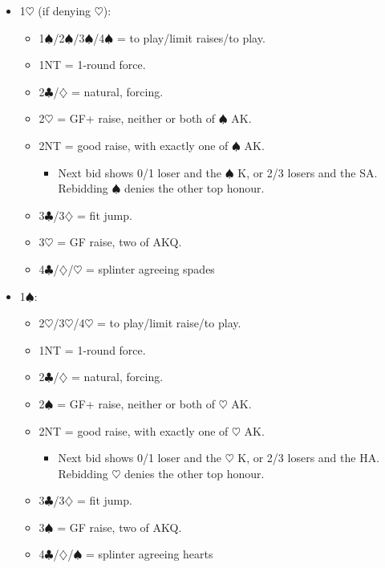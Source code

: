 \documentclass[a4paper,12pt]{article}
\begin{document}
\begin{itemize}
\item 1$\heartsuit$ (if denying $\heartsuit$):
	\begin{itemize}
   \item 1$\spadesuit$/2$\spadesuit$/3$\spadesuit$/4$\spadesuit$ = to play/limit raises/to play.
   \item 1NT = 1-round force.
   \item 2$\clubsuit$/$\diamondsuit$ = natural, forcing.
   \item 2$\heartsuit$ = GF+ raise, neither or both of $\spadesuit$ AK.
   \item 2NT = good raise, with exactly one of $\spadesuit$ AK.
		\begin{itemize}
      \item Next bid shows 0/1 loser and the $\spadesuit$ K, or 2/3 losers and the SA.
         Rebidding $\spadesuit$ denies the other top honour.
		\end{itemize}
   \item 3$\clubsuit$/3$\diamondsuit$ = fit jump.
   \item 3$\heartsuit$ = GF raise, two of AKQ.
   \item 4$\clubsuit$/$\diamondsuit$/$\heartsuit$ = splinter agreeing spades
	\end{itemize}

\item 1$\spadesuit$:
	\begin{itemize}
   \item 2$\heartsuit$/3$\heartsuit$/4$\heartsuit$ = to play/limit raise/to play.
   \item 1NT = 1-round force.
   \item 2$\clubsuit$/$\diamondsuit$ = natural, forcing.
   \item 2$\spadesuit$ = GF+ raise, neither or both of $\heartsuit$ AK.
   \item 2NT = good raise, with exactly one of $\heartsuit$ AK.
		\begin{itemize}
      \item Next bid shows 0/1 loser and the $\heartsuit$ K, or 2/3 losers and the HA.
         Rebidding $\heartsuit$ denies the other top honour.
		\end{itemize}
   \item 3$\clubsuit$/3$\diamondsuit$ = fit jump.
   \item 3$\spadesuit$ = GF raise, two of AKQ.
   \item 4$\clubsuit$/$\diamondsuit$/$\spadesuit$ = splinter agreeing hearts
	\end{itemize}


\end{itemize}
\end{document}
